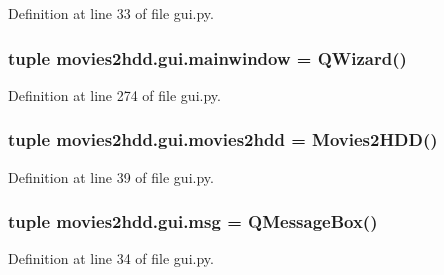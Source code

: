 Definition at line 33 of file gui.\-py.

\hypertarget{namespacemovies2hdd_1_1gui_ab66ae08952e6997fa86b05e376de756a}{
\subsubsection[{mainwindow}]{\setlength{\rightskip}{0pt plus 5cm}tuple movies2hdd.\-gui.\-mainwindow = Q\-Wizard()}}\label{namespacemovies2hdd_1_1gui_ab66ae08952e6997fa86b05e376de756a}


Definition at line 274 of file gui.\-py.

\hypertarget{namespacemovies2hdd_1_1gui_a186ac0ab862ac5332f6dfc3e927126f0}{
\subsubsection[{movies2hdd}]{\setlength{\rightskip}{0pt plus 5cm}tuple movies2hdd.\-gui.\-movies2hdd = {\bf Movies2\-H\-D\-D}()}}\label{namespacemovies2hdd_1_1gui_a186ac0ab862ac5332f6dfc3e927126f0}


Definition at line 39 of file gui.\-py.

\hypertarget{namespacemovies2hdd_1_1gui_a04dfe049e2e7207b12600d74a0b13749}{
\subsubsection[{msg}]{\setlength{\rightskip}{0pt plus 5cm}tuple movies2hdd.\-gui.\-msg = Q\-Message\-Box()}}\label{namespacemovies2hdd_1_1gui_a04dfe049e2e7207b12600d74a0b13749}


Definition at line 34 of file gui.\-py.

